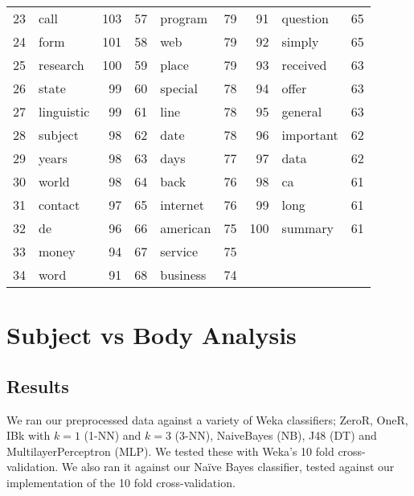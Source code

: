 \documentclass[10pt, a4paper]{article}
\begin{document}
\begin{table}[H]
\begin{tabular}{@{}rlrrlrrlr@{}}
23 & call & 103 & 57 & program & 79 & 91 & question & 65 \\
24 & form & 101 & 58 & web & 79 & 92 & simply & 65 \\
25 & research & 100 & 59 & place & 79 & 93 & received & 63 \\
26 & state & 99 & 60 & special & 78 & 94 & offer & 63 \\
27 & linguistic & 99 & 61 & line & 78 & 95 & general & 63 \\
28 & subject & 98 & 62 & date & 78 & 96 & important & 62 \\
29 & years & 98 & 63 & days & 77 & 97 & data & 62 \\
30 & world & 98 & 64 & back & 76 & 98 & ca & 61 \\
31 & contact & 97 & 65 & internet & 76 & 99 & long & 61 \\
32 & de & 96 & 66 & american & 75 & 100 & summary & 61 \\
33 & money & 94 & 67 & service & 75 &  &  &  \\
34 & word & 91 & 68 & business & 74 &  &  &  \\
\bottomrule
\end{tabular}
\label{table:bodycorpus}
\end{table}

\section{Subject vs Body Analysis}

\subsection{Results}


We ran our preprocessed data against a variety of Weka classifiers; ZeroR, OneR, IBk with $k=1$ (1-NN) and $k=3$ (3-NN), NaiveBayes (NB), J48 (DT) and MultilayerPerceptron (MLP). We tested these with Weka's 10 fold cross-validation. We also ran it against our Na\"ive Bayes classifier, tested against our implementation of the 10 fold cross-validation.
\end{document}
